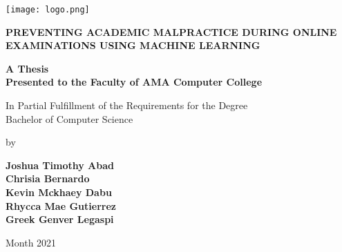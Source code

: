 \begin{titlepage}
    \begin{center}
        \vspace{6em}

        \texttt{[image: logo.png]}

        \begingroup
        \textbf{
            \uppercase{Preventing Academic Malpractice During Online Examinations using Machine Learning}
        }
        \endgroup

        \vspace{6em}

        \textbf{A Thesis\\
            Presented to the Faculty of AMA Computer College}

        \vspace{6em}

        In Partial Fulfillment of the Requirements for the Degree\\
        Bachelor of Computer Science

        \vspace{5em}

        by

        \vspace{3em}

        \textbf{
            Joshua Timothy Abad \\
            Chrisia Bernardo \\
            Kevin Mckhaey Dabu \\
            Rhycca Mae Gutierrez \\
            Greek Genver Legaspi
        }

        \vspace{2em}

        Month 2021

    \end{center}
\end{titlepage}
